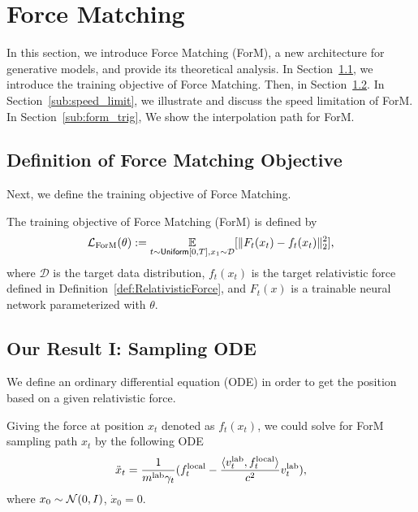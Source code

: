 \section{Force Matching} \label{sec:form}

In this section, we introduce Force Matching (ForM), a new architecture for generative models, and provide its theoretical analysis. In Section~\ref{sub:obj}, we introduce the training objective of Force Matching. Then, in Section~\ref{sub:samp_ode}. In Section~\ref{sub:speed_limit}, we illustrate and discuss the speed limitation of ForM. In Section~\ref{sub:form_trig}, We show the interpolation path for ForM.


\subsection{Definition of Force Matching Objective} \label{sub:obj}

Next, we define the training objective of Force Matching.

\begin{definition}
\label{def:FormObjective}
The training objective of Force Matching (ForM) is defined by
\begin{align*}
     \mathcal{L}_{\rm ForM}(\theta) := \operatorname*{{\mathbb{E}}}_{t \sim {\sf Uniform}[0,T], x_1 \sim \mathcal{D}} 
    [\| F_t(x_t) - f_t(x_t)\|_2^2],   
\end{align*}
where $\mathcal{D}$ is the target data distribution, $f_t(x_t)$ is the target relativistic force defined in Definition~\ref{def:RelativisticForce}, and $F_t(x)$ is a trainable neural network parameterized with $\theta$.
\end{definition}

\subsection{Our Result I: Sampling ODE} \label{sub:samp_ode}

We define an ordinary differential equation (ODE) in order to get the position based on a given relativistic force. 

\begin{theorem}\label{thm:ode_form:informal}
    Giving the force at position $x_t$ denoted as $f_t(x_t)$, we could solve for ForM sampling path $x_t$ by the following ODE
    \begin{align*}
    \ddot{x}_t = \frac{1}{m^{\rm lab} \gamma_t}(f_t^{\rm local} - \frac{\langle v_t^{\rm lab}, f_t^{\rm local} \rangle}{c^2} v_t^{\rm lab}),
    \end{align*}
    where $x_0 \sim \mathcal{N}(0,I)$, $\dot{x}_0 = 0$.
\end{theorem}

